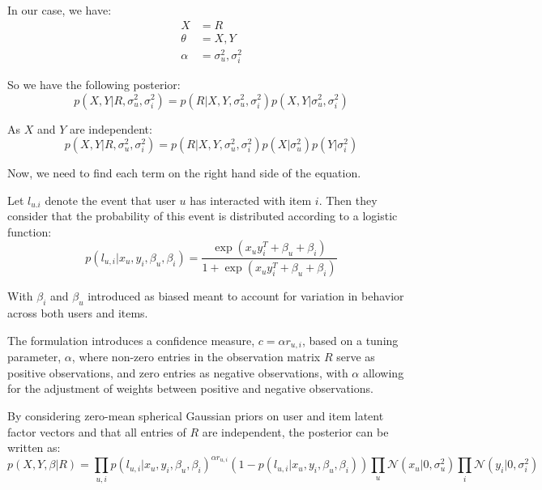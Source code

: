 In our case, we have:
\begin{align*}
    X &= R \\
    \theta &= X, Y \\
    \alpha &= \sigma_u^2, \sigma_i^2
\end{align*}

So we have the following posterior:
\[
p(X, Y | R, \sigma_u^2, \sigma_i^2) = p(R | X, Y, \sigma_u^2, \sigma_i^2) p(X, Y | \sigma_u^2, \sigma_i^2)
\]

As $X$ and $Y$ are independent:
\[
p(X, Y | R, \sigma_u^2, \sigma_i^2) = p(R | X, Y, \sigma_u^2, \sigma_i^2) p(X | \sigma_u^2) p(Y | \sigma_i^2)
\]

Now, we need to find each term on the right hand side of the equation.

Let $l_{u.i}$ denote the event that user $u$ has interacted with item $i$.
Then they consider that the probability of this event is distributed according to a logistic function:
\[
p( l_{u,i} | x_u, y_i, \beta_u, \beta_i) = \frac{\exp(x_u y_i^T + \beta_u + \beta_i)}{1 + \exp(x_u y_i^T + \beta_u + \beta_i)}
\]

With $\beta_i$ and $\beta_u$ introduced as biased meant to account for
variation in behavior across both users and items.

The formulation introduces a confidence measure, $c = \alpha r_{u,i}$, based on a tuning parameter, $\alpha$, where non-zero entries in the observation matrix $R$ serve as positive observations, and zero entries as negative observations, with $\alpha$ allowing for the adjustment of weights between positive and negative observations.

By considering zero-mean spherical Gaussian priors on user and item latent factor
vectors and that all entries of $R$ are independent, the posterior can be written as:
\[
p(X, Y, \beta | R) = \prod_{u,i} p(l_{u,i} | x_u, y_i, \beta_u, \beta_i)^{\alpha r_{u,i}} (1 - p(l_{u,i} | x_u, y_i, \beta_u, \beta_i)) \prod_u
 \mathcal{N}(x_u | 0, \sigma_{u}^2) \prod_i \mathcal{N}(y_i | 0, \sigma_{i}^2)
 \]


